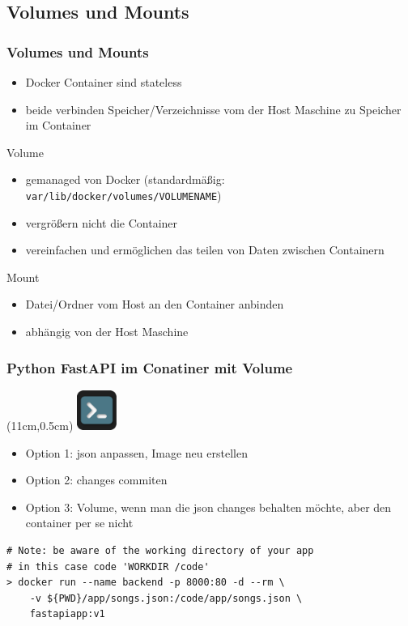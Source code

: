\documentclass[22pt]{beamer}
\newcommand{\code}[1]{\colorbox{darkgray!20}{\texttt{#1}}}
\newcommand{\terminal}{
    \begin{textblock*}{1.3cm}(11cm,0.5cm) %
    \includegraphics[width=1.3cm]{Bilder/terminal2.png}
    \end{textblock*}
}
\begin{document}
\subsection{Volumes und Mounts}
\begin{frame}[t]
    \frametitle{Volumes und Mounts}
    \begin{itemize}
        \item Docker Container sind stateless
        \item beide verbinden Speicher/Verzeichnisse vom der Host Maschine zu Speicher im Container
    \end{itemize} \pause
    \begin{block}{Volume}
        \begin{itemize}
            \item gemanaged von Docker (standardmäßig: \code{var/lib/docker/volumes/VOLUMENAME})
            \item vergrößern nicht die Container
            \item vereinfachen und ermöglichen das teilen von Daten zwischen Containern
        \end{itemize}
    \end{block} \pause
    \begin{block}{Mount}
        \begin{itemize}
            \item Datei/Ordner vom Host an den Container anbinden
            \item abhängig von der Host Maschine
        \end{itemize}
    \end{block}
\end{frame}

\begin{frame}[fragile]
    \frametitle{Python FastAPI im Conatiner mit Volume}
    \terminal
    \begin{itemize}
        \item Option 1: json anpassen, Image neu erstellen
        \item Option 2: changes commiten
        \item Option 3: Volume, wenn man die json changes behalten möchte, aber den container per se nicht
    \end{itemize}
\vspace{0.8cm}
\begin{verbatim}
# Note: be aware of the working directory of your app
# in this case code 'WORKDIR /code'
> docker run --name backend -p 8000:80 -d --rm \
    -v ${PWD}/app/songs.json:/code/app/songs.json \
    fastapiapp:v1
\end{verbatim}
            
\end{frame}
\end{document}
